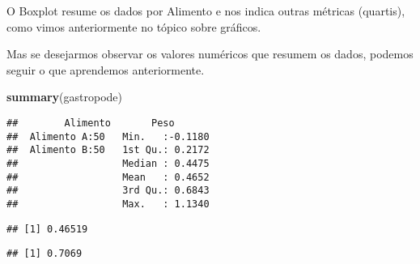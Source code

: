\documentclass[titlepage, oneside, openany, a4paper]{book}
\newenvironment{Shaded}{\begin{snugshade}}{\end{snugshade}}
\newcommand{\KeywordTok}[1]{\textcolor[rgb]{0.13,0.29,0.53}{\textbf{#1}}}
\newcommand{\NormalTok}[1]{#1}
\newcommand{\OperatorTok}[1]{\textcolor[rgb]{0.81,0.36,0.00}{\textbf{#1}}}
\newcommand{\StringTok}[1]{\textcolor[rgb]{0.31,0.60,0.02}{#1}}
\begin{document}
O Boxplot resume os dados por Alimento e nos indica outras métricas (quartis), como vimos anteriormente no tópico sobre gráficos.

Mas se desejarmos observar os valores numéricos que resumem os dados, podemos seguir o que aprendemos anteriormente.

\begin{Shaded}
\begin{Highlighting}[]
\KeywordTok{summary}\NormalTok{(gastropode)}
\end{Highlighting}
\end{Shaded}

\begin{verbatim}
##        Alimento       Peso        
##  Alimento A:50   Min.   :-0.1180  
##  Alimento B:50   1st Qu.: 0.2172  
##                  Median : 0.4475  
##                  Mean   : 0.4652  
##                  3rd Qu.: 0.6843  
##                  Max.   : 1.1340
\end{verbatim}

\begin{Shaded}
\end{Shaded}

\begin{verbatim}
## [1] 0.46519
\end{verbatim}

\begin{Shaded}
\end{Shaded}

\begin{verbatim}
## [1] 0.7069
\end{verbatim}

\begin{Shaded}
\end{Shaded}
\end{document}
